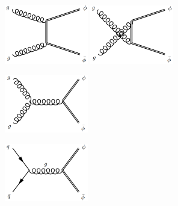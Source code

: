 \begin{figure}
  \centering
                \begin{subfigure}[t]{0.9\textwidth}
                \qquad\qquad
                \includegraphics[width=0.4\textwidth]{figures/gfa.pdf}
                \includegraphics[width=0.4\textwidth]{figures/gfb.pdf}
                \label{gfa}
                \end{subfigure}
                \begin{subfigure}[t]{0.9\textwidth}
                \centering
                \includegraphics[width=0.4\textwidth]{figures/gfd.pdf}
                \label{gfb}
                \end{subfigure}
                \begin{subfigure}[t]{0.9\textwidth}
                \qquad\qquad
                \includegraphics[width=0.4\textwidth]{figures/qfe.pdf}

\end{subfigure}
\end{figure}
